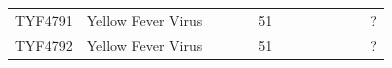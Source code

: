 \begin{longtable}{@{}lllllllllllll@{}}
TYF4791        & Yellow Fever Virus &                                           &                                        &             & 51                      &                       &           &          &                             &                    &                                                                                                  & ?                          \\
TYF4792        & Yellow Fever Virus &                                           &                                        &             & 51                      &                       &           &          &                             &                    &                                                                                                  & ?                          \\ \bottomrule
\end{longtable}